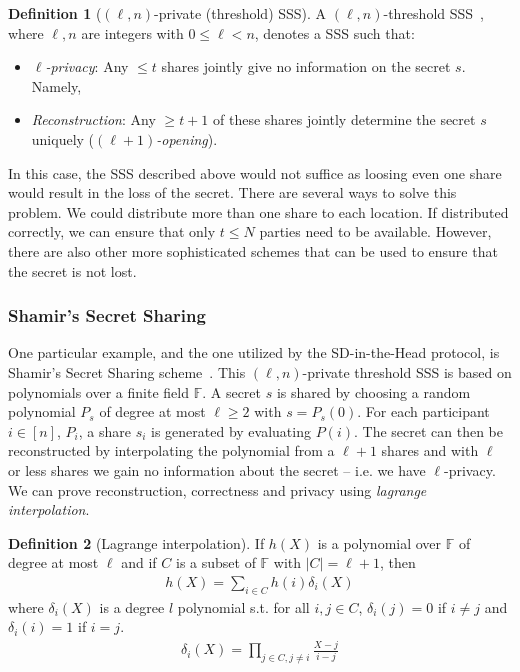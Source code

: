 \documentclass[twoside,11pt]{report}
\theoremstyle{definition}
\newtheorem{definition}{Definition}[section]
\theoremstyle{plain}
\begin{document}
\begin{definition}[$(\ell, n)$-private (threshold) SSS]\label{def:mpc-ss-threshold}
  A $(\ell, n)$-threshold SSS~\cite{cramer2015secure}, where $\ell, n$ are integers with $0 \leq \ell < n$, denotes a SSS such that:
  \begin{itemize}[parsep=0pt, itemsep=0pt]
    \item \textit{$\ell$-privacy}: Any $\leq t$ shares jointly give no information on the secret $s$. Namely,
    \item \textit{Reconstruction}: Any $\geq t + 1$ of these shares jointly determine the secret $s$ uniquely (\textit{$(\ell + 1)$-opening}).
  \end{itemize}
\end{definition}

In this case, the SSS described above would not suffice as loosing even one share would result in the loss of the secret. There are several ways to solve this problem. We could distribute more than one share to each location. If distributed correctly, we can ensure that only $t \leq N$ parties need to be available. However, there are also other more sophisticated schemes that can be used to ensure that the secret is not lost.

\subsubsection{Shamir's Secret Sharing}\label{sec:shamir}

One particular example, and the one utilized by the SD-in-the-Head protocol, is Shamir's Secret Sharing scheme~\cite{shamir1979share,cramer2015secure}. This $(\ell, n)$-private threshold SSS is based on polynomials over a finite field $\mathbb{F}$. A secret $s$ is shared by choosing a random polynomial $P_s$ of degree at most $\ell \geq 2$ with $s = P_s(0)$. For each participant $i \in [n]$, $P_i$, a share $s_i$ is generated by evaluating $P(i)$. The secret can then be reconstructed by interpolating the polynomial from a $\ell + 1$ shares and with $\ell$ or less shares we gain no information about the secret -- i.e. we have $\ell$-privacy. We can prove reconstruction, correctness and privacy using \textit{lagrange interpolation}.

\begin{definition}[Lagrange interpolation]\label{def:lagrange}
  If $h(X)$ is a polynomial over $\mathbb{F}$ of degree at most $\ell$ and if $C$ is a subset of $\mathbb{F}$ with $|C| = \ell + 1$, then
  \begin{align}\label{eq:lagrange1}
    h(X) = \sum_{i\in C}h(i)\delta_i(X)
  \end{align}
  where $\delta_i(X)$ is a degree $l$ polynomial s.t. for all $i,j \in C$, $\delta_i(j) = 0$ if $i \neq j$ and $\delta_i(i) = 1$ if $i = j$.
  \begin{align}\label{eq:lagrange2}
    \delta_i(X) = \prod_{j \in C,j\neq i} \frac{X-j}{i-j}
  \end{align}
\end{definition}
\end{document}
